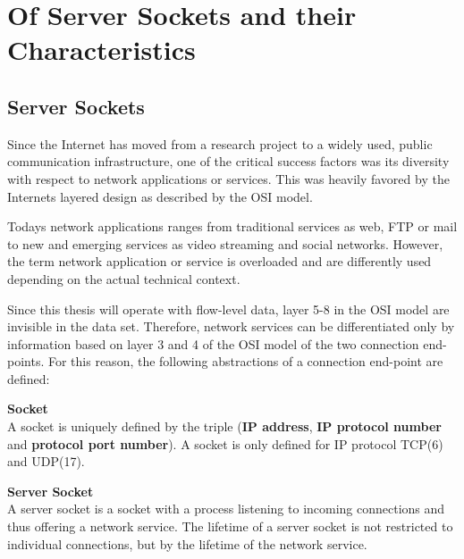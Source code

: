 

\chapter{Of Server Sockets and their Characteristics 
\label{chapter:sockets}}

\section{Server Sockets} Since the Internet has moved from a research project to a widely used, public communication infrastructure, one of the critical success factors was its diversity with respect to network applications or services. This was heavily favored by the Internets layered design as described by the OSI model. 

Todays network applications ranges from traditional services as web, FTP or mail to new and emerging services as video streaming and social networks. However, the term network application or service is overloaded and are differently used depending on the actual technical context.

Since this thesis will operate with flow-level data, layer 5-8 in the OSI model are invisible in the data set. Therefore, network services can be differentiated only by information based on layer 3 and 4 of the OSI model of the two connection end-points. For this reason, the following abstractions of a connection end-point are defined:

\parbox{ 
\textwidth}{ 
\begin{defn}
	{\textbf{Socket}\\} A socket is uniquely defined by the triple (\textbf{IP address}, \textbf{IP protocol number} and \textbf{protocol port number}). A socket is only defined for IP protocol TCP(6) and UDP(17). 
\end{defn}
}

\parbox{ 
\textwidth}{ 
\begin{defn}
	{\textbf{Server Socket 
	\label{def:serversocket}}\\} A server socket is a socket with a process listening to incoming connections and thus offering a network service. The lifetime of a server socket is not restricted to individual connections, but by the lifetime of the network service. 
\end{defn}
}

